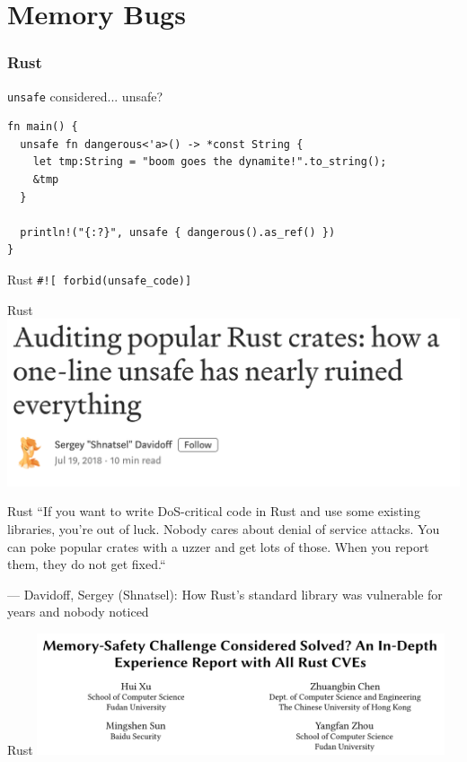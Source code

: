\documentclass[aspectratio=169,14pt]{beamer}
\begin{document}
  \section{Memory Bugs}
  \begin{frame}[fragile]
    \frametitle{Rust}
    \begin{listing}[H]
      \caption{\texttt{unsafe} considered... unsafe?}
      \begin{verbatim}
fn main() {
  unsafe fn dangerous<'a>() -> *const String {
    let tmp:String = "boom goes the dynamite!".to_string();
    &tmp
  }

  println!("{:?}", unsafe { dangerous().as_ref() })
}
      \end{verbatim}
    \end{listing}
  \end{frame}
  \begin{frame}{Rust}
    \texttt{\#![\,forbid(unsafe\_code)]\,}
  \end{frame}
  \begin{frame}{Rust}
    \includegraphics[width=14cm]{auditing_rust_crates}
  \end{frame}
  \begin{frame}{Rust}
    ``If you want to write DoS-critical code in Rust and use some existing
    libraries, you’re out of luck. Nobody cares about denial of service attacks.
    You can poke popular crates with a uzzer and get lots of those. When you report them, they do not get fixed.``

    --- Davidoff, Sergey (Shnatsel): How Rust’s standard library was vulnerable for years and nobody noticed
  \end{frame}
  \begin{frame}{Rust}
    \includegraphics[width=12cm]{rust_memory}
  \end{frame}
\end{document}
